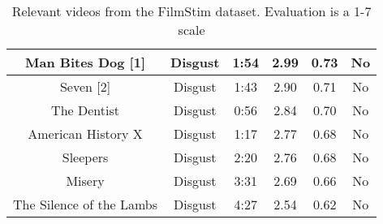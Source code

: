 \begin{table}[]
\begin{tabular}{|c|c|c|c|c|c|}
          Man Bites Dog [1] & Disgust & 1:54 & 2.99 &0.73  & No \\ \hline
          Seven [2] & Disgust & 1:43 & 2.90 &0.71  & No \\ \hline
          The Dentist & Disgust & 0:56 & 2.84 &0.70  & No \\ \hline
          American History X & Disgust & 1:17 & 2.77  &0.68 & No \\ \hline
          Sleepers & Disgust & 2:20 & 2.76 &0.68  & No \\ \hline
          Misery & Disgust & 3:31 & 2.69 &0.66  & No \\ \hline
          The Silence of the Lambs & Disgust & 4:27 & 2.54 &0.62  & No \\ \hline
 
          
          
    \end{tabular}
    \caption{Relevant videos from the FilmStim dataset. Evaluation is a 1-7 scale \cite{FilmStim}}
    \label{tab:filmstim}
\end{table}


